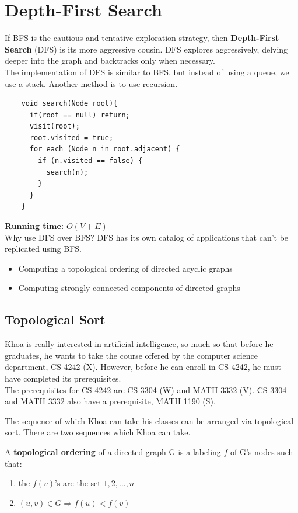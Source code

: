 \documentclass[]{book}
\newcommand{\runtime}[1]{\textbf{Running time:} $O(#1)$\\}
\begin{document}
  \section{Depth-First Search}
  If BFS is the cautious and tentative exploration strategy, then \textbf{Depth-First Search}
  (DFS) is its more aggressive cousin. DFS explores aggressively, delving deeper
  into the graph and backtracks only when necessary.\\
  \indent The implementation of DFS is similar to BFS, but instead of using a queue, we
  use a stack. Another method is to use recursion.\\
  \begin{Verbatim}
    void search(Node root){
      if(root == null) return;
      visit(root);
      root.visited = true;
      for each (Node n in root.adjacent) {
        if (n.visited == false) {
          search(n);
        }
      }
    }
  \end{Verbatim}
  \runtime{V + E}
  Why use DFS over BFS? DFS has its own catalog of applications that can't be replicated
  using BFS.
  \begin{itemize}
    \item Computing a topological ordering of directed acyclic graphs
    \item Computing strongly connected components of directed graphs
  \end{itemize}

  \subsection{Topological Sort}
  Khoa is really interested in artificial intelligence, so much so that before he graduates,
  he wants to take the course offered by the computer science department, CS 4242 (X).
  However, before he can enroll in CS 4242, he must have completed its prerequisites.\\
  \indent The prerequisites for CS 4242 are CS 3304 (W) and MATH 3332 (V). CS 3304 and MATH 3332
  also have a prerequisite, MATH 1190 (S).

  The sequence of which Khoa can take his classes can be arranged via topological sort.
  There are two sequences which Khoa can take.

  A \textbf{topological ordering} of a directed graph G
  is a labeling $f$ of G's nodes such that:
  \begin{enumerate}
    \item the $f(v)$'s are the set ${1,2,\ldots, n}$
    \item $(u,v) \in G \Rightarrow f(u) < f(v)$
  \end{enumerate}
\end{document}
